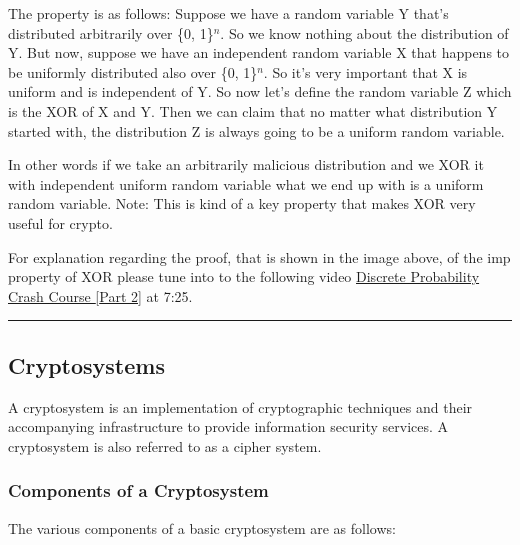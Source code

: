 \documentclass[11pt]{article}
\begin{document}
The property is as follows: Suppose we have a random variable Y that's
distributed arbitrarily over \{0, 1\}\(^n\). So we know nothing about
the distribution of Y. But now, suppose we have an independent random
variable X that happens to be uniformly distributed also over \{0,
1\}\(^n\). So it's very important that X is uniform and is independent
of Y. So now let's define the random variable Z which is the XOR of X
and Y. Then we can claim that no matter what distribution Y started
with, the distribution Z is always going to be a uniform random
variable.

In other words if we take an arbitrarily malicious distribution and we
XOR it with independent uniform random variable what we end up with is a
uniform random variable. Note: This is kind of a key property that makes
XOR very useful for crypto.

For explanation regarding the proof, that is shown in the image above,
of the imp property of XOR please tune into to the following video
\href{https://www.coursera.org/learn/crypto/lecture/JkDRg/discrete-probability-crash-course-cont}{Discrete
Probability Crash Course {[}Part 2{]}} at 7:25.

\begin{center}\rule{0.5\linewidth}{\linethickness}\end{center}

    \hypertarget{cryptosystems}{%
\subsection{Cryptosystems}\label{cryptosystems}}

A cryptosystem is an implementation of cryptographic techniques and
their accompanying infrastructure to provide information security
services. A cryptosystem is also referred to as a cipher system.

\hypertarget{components-of-a-cryptosystem}{%
\subsubsection{Components of a
Cryptosystem}\label{components-of-a-cryptosystem}}

The various components of a basic cryptosystem are as follows:
\end{document}
